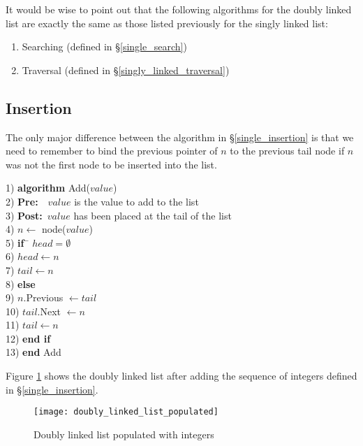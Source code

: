 It would be wise to point out that the following algorithms for the doubly linked list are exactly the same as those listed previously for the singly linked list:

\begin{enumerate}
\item Searching (defined in \S\ref{single_search})
\item Traversal (defined in \S\ref{singly_linked_traversal})
\end{enumerate}

\subsection{Insertion}
The only major difference between the algorithm in \S\ref{single_insertion} is that we need to remember to bind the previous pointer of $n$ to the previous tail node if $n$ was not the first node to be inserted into the list.

\begin{tabbing}
1)  \textbf{alg}\= \textbf{orithm} Add($value$) \\
2)  \> \textbf{Pre:}~~$value$ is the value to add to the list \\
3)  \> \textbf{Post:}~$value$ has been placed at the tail of the list \\
4)  \> $n \leftarrow$ node($value$) \\
5)  \> \textbf{if}~\= $head = \emptyset$ \\
6)  \> \> $head \leftarrow n$ \\
7)  \> \> $tail \leftarrow n$ \\
8)  \> \textbf{else} \\
9)  \> \> $n$.Previous $\leftarrow tail$ \\
10) \> \> $tail$.Next $\leftarrow n$ \\
11) \> \> $tail \leftarrow n$ \\
12) \> \textbf{end if} \\
13) \textbf{end} Add \\
\end{tabbing}

Figure \ref{fig:doubly_linked_list_add} shows the doubly linked list after adding the sequence of integers defined in \S\ref{single_insertion}.

\begin{figure}[h]
\begin{center}
\texttt{[image: doubly\_linked\_list\_populated]}
\end{center}
\caption{Doubly linked list populated with integers} \label{fig:doubly_linked_list_add}
\end{figure}

